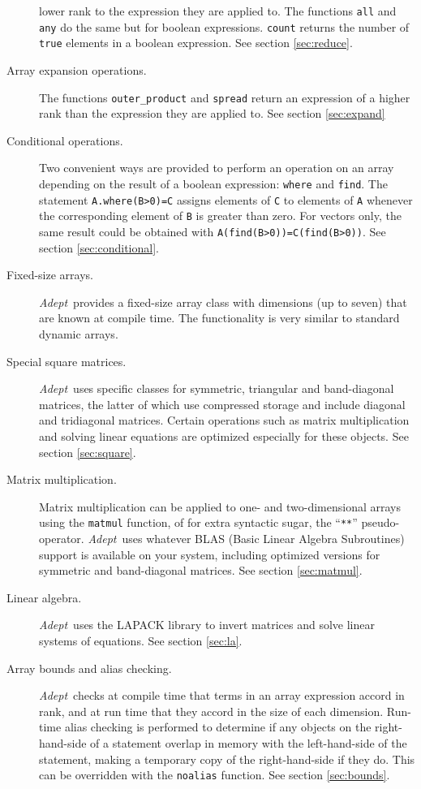 \documentclass[a4,oneside]{book}
\def\codesize{\small}
\def\Adept{\emph{Adept}}
\def\code#1{{\codesize\texttt{#1}}}
\begin{document}
\begin{description}
  lower rank to the expression they are applied to. The functions
  \code{all} and \code{any} do the same but for boolean
  expressions. \code{count} returns the number of \code{true} elements
  in a boolean expression.
  See section \ref{sec:reduce}.
\item[Array expansion operations.] The functions \code{outer\_product}
  and \code{spread} return an expression of a higher rank than the
  expression they are applied to. See section \ref{sec:expand}
\item[Conditional operations.] Two convenient ways are provided to
  perform an operation on an array depending on the result of a
  boolean expression: \code{where} and \code{find}. The statement
  \code{A.where(B>0)=C} assigns elements of \code{C} to elements of
  \code{A} whenever the corresponding element of \code{B} is greater
  than zero. For vectors only, the same result could be obtained with
  \code{A(find(B>0))=C(find(B>0))}. See section \ref{sec:conditional}.
\item[Fixed-size arrays.] \Adept\ provides a fixed-size array class
  with dimensions (up to seven) that are known at compile time. The
  functionality is very similar to standard dynamic arrays.
\item[Special square matrices.] \Adept\ uses specific classes for
  symmetric, triangular and band-diagonal matrices, the latter of
  which use compressed storage and include diagonal and tridiagonal
  matrices. Certain operations such as matrix multiplication and solving
  linear equations are optimized especially for these objects. See
  section \ref{sec:square}.
\item[Matrix multiplication.] Matrix multiplication can be applied to
  one- and two-dimensional arrays using the \code{matmul} function, of
  for extra syntactic sugar, the ``\code{**}''
  pseudo-operator. \Adept\ uses whatever BLAS (Basic Linear Algebra
  Subroutines) support is available on your system, including
  optimized versions for symmetric and band-diagonal matrices. See
  section \ref{sec:matmul}.
\item[Linear algebra.] \Adept\ uses the LAPACK library to invert
  matrices and solve linear systems of equations. See section
  \ref{sec:la}.
\item[Array bounds and alias checking.] \Adept\ checks at compile time
  that terms in an array expression accord in rank, and at run time
  that they accord in the size of each dimension. Run-time alias
  checking is performed to determine if any objects on the
  right-hand-side of a statement overlap in memory with the
  left-hand-side of the statement, making a temporary copy of the
  right-hand-side if they do. This can be overridden with the
  \code{noalias} function. See section \ref{sec:bounds}.
\end{description}%
%
\end{document}
